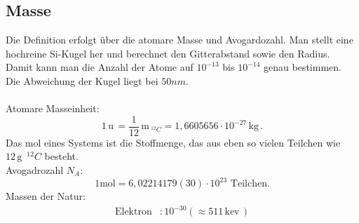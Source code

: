 \documentclass[a4paper,12pt]{article}
\begin{document}
\subsection{Masse}
Die Definition erfolgt über die atomare Masse und Avogardozahl. Man stellt eine hochreine Si-Kugel her und berechnet den Gitterabstand sowie den Radius. Damit kann man die Anzahl der Atome auf $10^{-13}$ bis $10^{-14}$ genau bestimmen. Die Abweichung der Kugel liegt bei $50nm$.\\\\
Atomare Masseinheit:
\[ 
        1\,\text{u}\,=\dfrac{1}{12}\,\text{m}\,_{^{12}C}=1,6605656\cdot 10^{-27}\,\text{kg}\,
.\] 
Das mol eines Systems ist die Stoffmenge, das aus eben so vielen Teilchen wie $12\,\text{g}\,$ $^{12}C$ besteht.\\
Avogadrozahl $N_{A}$:
\[ 
1\text{mol}=6,02214179\left( 30\right) \cdot 10^{23}\text{ Teilchen}
.\] 
Massen der Natur:
\begin{align*}
        \text{Elektron}&:10^{-30}\left( \approx 511\,\text{kev}\,\right) 
\end{align*}
\end{document}
